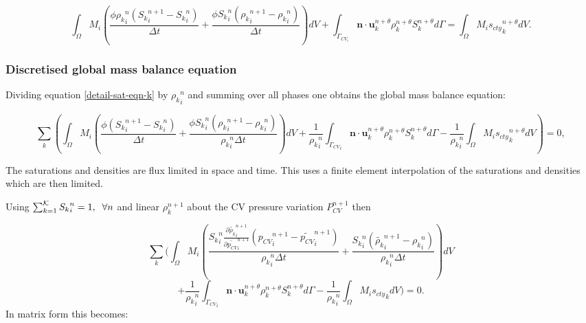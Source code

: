 \begin{equation}
\int_\Omega M_i (\frac{\phi{\rho_k}_i^n ({S_k}_i^{n+1}-{S_k}_i^n) }{\Delta t}
+ \frac{\phi{S_k}_i^n( {\rho_k}_i^{n+1}-{\rho_k}_i^n)} {\Delta t} ) dV
+ \int_{\Gamma_{CV_i}} {\mathbf n} \cdot {\mathbf u}_k^{n+\theta} \rho_k^{n+\theta} S_k^{n+\theta}
d\Gamma
= \int_\Omega M_i {s_{cty}}_k^{n+\theta} dV.
\label{detail-sat-eqn-k}
\end{equation}


\subsubsection{Discretised global mass balance equation}

Dividing equation \ref{detail-sat-eqn-k} by ${\rho_k}^n_i $ and summing
over all phases one obtains the global mass balance equation:


\begin{equation}
 \sum_k \left(
\int_\Omega M_i (\frac{ \phi({S_k}_i^{n+1}-{S_k}_i^n) }{\Delta t}
+ \frac{\phi{S_k}_i^n( {\rho_k}_i^{n+1}-{\rho_k}_i^n)} {{\rho_k}_i^n\Delta t} ) dV
+ \frac{1}{{\rho_k}_i^n}\int_{{\Gamma_{CV}}_i}
{\mathbf n} \cdot {\mathbf u}_k^{n+\theta} \rho_k^{n+\theta}   S_k^{n+\theta} d\Gamma
- \frac{1}{{\rho_k}_i^n} \int_\Omega M_i {s_{cty}}_k^{n+\theta} dV \right) =0,
\label{detail-sat-eqn-k-sum}
\end{equation}

The saturations and densities are flux limited in space and
time. This uses a finite element
interpolation of the saturations and densities which are then limited.



Using $\sum_{k=1}^{\cal K} {S_k}_i^n =1, \;\; \forall n$ and linear
$\rho_k^{n+1}$ about the CV pressure variation $P_{CV}^{n+1}$ then

\begin{equation}
 \sum_k ( \int_{\Omega} M_i
( \frac{{S_k}_i^n \frac{\partial \tilde{\rho_k}_i^{n+1}}{\partial \tilde{ p_{CV}}_i^{n+1}}({p_{CV}}_i^{n+1}-\tilde{p_{CV}}_i^{n+1})
} {{\rho_k}_i^n\Delta t}
+ \frac{{S_k}_i^n( \tilde{\rho_k}_i^{n+1}-{\rho_k}_i^n)}
{{\rho_k}_i^n \Delta t} ) dV
\end{equation}
\begin{equation}
+ \frac{1}{{\rho_k}_i^n}\int_{{\Gamma_{CV}}_i} {\mathbf n} \cdot {\mathbf u}_k^{n+\theta} \rho_k^{n+\theta} S_k^{n+\theta} d\Gamma
- \frac{1}{{\rho_k}_i^n} \int_\Omega M_i {s_{cty}}_k dV ) =0.
\label{detail-global-cty}
\end{equation}
In matrix form this becomes:

